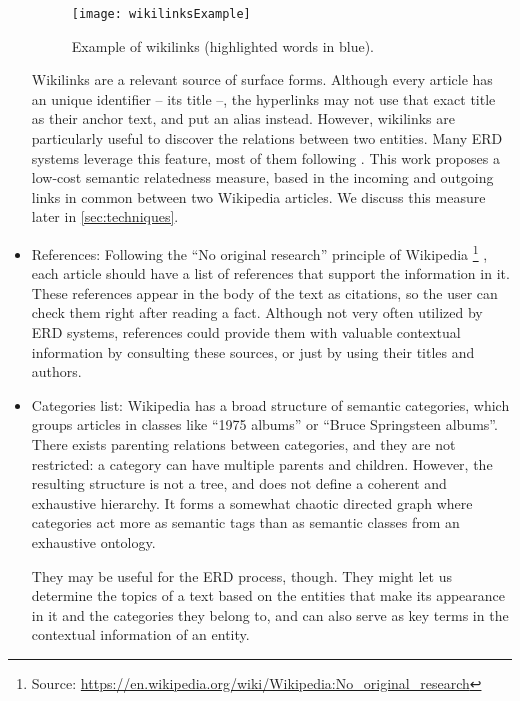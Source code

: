 \begin{itemize}
\begin{figure}[!ht]
\centering
\texttt{[image: wikilinksExample]}

\caption{Example of wikilinks (highlighted words in blue).}
\label{fig:wikilinksExample}
\end{figure}%

Wikilinks are a relevant source of surface forms. Although every article has an unique identifier -- its title --, the hyperlinks may not use that exact title as their anchor text, and put an alias instead. However, wikilinks are particularly useful to discover the relations between two entities. Many ERD systems leverage this feature, most of them following \cite{witten2008}. This work proposes a low-cost semantic relatedness measure, based in the incoming and outgoing links in common between two Wikipedia articles. We discuss this measure later in \autoref{sec:techniques}.

\item References: Following the ``No original research'' principle of Wikipedia%
\footnote{Source: \url{https://en.wikipedia.org/wiki/Wikipedia:No_original_research}}%
, each article should have a list of references that support the information in it. These references appear in the body of the text as citations, so the user can check them right after reading a fact. Although not very often utilized by ERD systems, references could provide them with valuable contextual information by consulting these sources, or just by using their titles and authors.

\item Categories list: Wikipedia has a broad structure of semantic categories, which groups articles in classes like ``1975 albums'' or ``Bruce Springsteen albums''. There exists parenting relations between categories, and they are not restricted: a category can have multiple parents and children. However, the resulting structure is not a tree, and does not define a coherent and exhaustive hierarchy. It forms a somewhat chaotic directed graph where categories act more as semantic tags than as semantic classes from an exhaustive ontology.

They may be useful for the ERD process, though. They might let us determine the topics of a text based on the entities that make its appearance in it and the categories they belong to, and can also serve as key terms in the contextual information of an entity.

\end{itemize}

